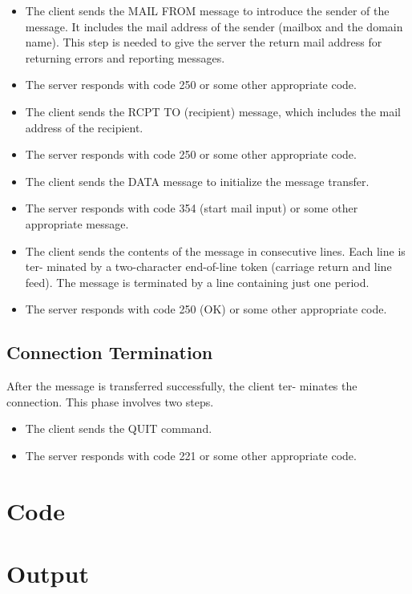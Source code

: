 \documentclass[a4paper,12pt]{article}
\begin{document}
\begin{itemize}
    \item The client sends the MAIL FROM message to introduce the sender of the 
    message. It includes the mail address of the sender (mailbox and the domain 
    name). This step is needed to give the server the return mail address for 
    returning errors and reporting messages.

    \item The server responds with code 250 or some other appropriate code.

    \item The client sends the RCPT TO (recipient) message, which includes the mail address
    of the recipient.

    \item The server responds with code 250 or some other appropriate code.

    \item The client sends the DATA message to initialize the message transfer.

    \item The server responds with code 354 (start mail input) or some other appropriate
    message.

    \item The client sends the contents of the message in consecutive lines. 
    Each line is ter- minated by a two-character end-of-line token 
    (carriage return and line feed). The message is terminated by a line 
    containing just one period.

    \item The server responds with code 250 (OK) or some other appropriate code.

\end{itemize}

\subsection{Connection Termination}
After the message is transferred successfully, the client ter- minates the connection. 
This phase involves two steps.
\begin{itemize}
    \item The client sends the QUIT command.
    \item The server responds with code 221 or some other appropriate code.
\end{itemize}

\section{Code}

\section{Output}
\end{document}
